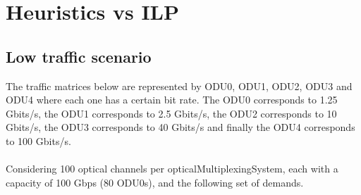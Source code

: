 \clearpage
\section{Heuristics vs ILP}
\subsection{Low traffic scenario}

The traffic matrices below are represented by ODU0, ODU1, ODU2, ODU3 and ODU4 where each one has a certain bit rate. The ODU0 corresponds to 1.25 Gbits/s, the ODU1 corresponds to 2.5 Gbits/s, the ODU2 corresponds to 10 Gbits/s, the ODU3 corresponds to 40 Gbits/s and finally the ODU4 corresponds to 100 Gbits/s.\\ \\
Considering 100 optical channels per opticalMultiplexingSystem, each with a capacity of 100 Gbps (80 ODU0s), and the following set of demands.\\ \\

